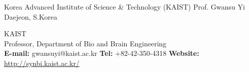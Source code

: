 \begin{cventries}
  \cventry
    {Korea Advanced Institute of Science \& Technology (KAIST)} %
    {Prof. Gwansu Yi} %
    {Daejeon, S.Korea} %
    {} %
    {
      \begin{cvitems} %
        KAIST \\
        Professor, Department of Bio and Brain Engineering \\
        \textbf{E-mail:} gwansuyi@kaist.ac.kr \textbf{Tel:} +82-42-350-4318 
         \textbf{Website:} \url{http://synbi.kaist.ac.kr/}
      \end{cvitems}
    }




\end{cventries}
